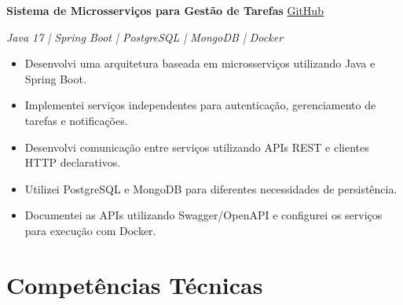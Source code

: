 \documentclass[a4paper,10pt]{article}
\begin{document}
\vspace{0.01cm}

\textbf{Sistema de Microsserviços para Gestão de Tarefas}
\hfill
\href{https://github.com/usuario/microsservicos}{GitHub}

\textit{Java 17 | Spring Boot | PostgreSQL | MongoDB | Docker}

\begin{itemize}

    \item Desenvolvi uma arquitetura baseada em microsserviços utilizando Java e Spring Boot.

    \item Implementei serviços independentes para autenticação, gerenciamento de tarefas e notificações.

    \item Desenvolvi comunicação entre serviços utilizando APIs REST e clientes HTTP declarativos.

    \item Utilizei PostgreSQL e MongoDB para diferentes necessidades de persistência.

    \item Documentei as APIs utilizando Swagger/OpenAPI e configurei os serviços para execução com Docker.

\end{itemize}


\section{Competências Técnicas}
\end{document}
